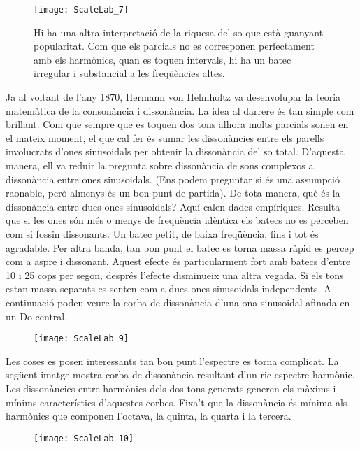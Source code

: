 \begin{figure}[h]
\centering
\texttt{[image: ScaleLab\_7]}
\caption*{Hi ha una altra interpretació de la riquesa del so que està guanyant popularitat. Com que els parcials no es corresponen perfectament amb els harmònics, quan es toquen intervals, hi ha un batec irregular i substancial a les freqüències altes.}
\end{figure}

Ja al voltant de l'any 1870, Hermann von Helmholtz va desenvolupar la teoria matemàtica de la consonància i dissonància. La idea al darrere és tan simple com brillant. Com que sempre que es toquen dos tons alhora molts parcials sonen en el mateix moment, el que cal fer és sumar les dissonàncies entre els parells involucrats d'ones sinusoidals per obtenir la dissonància del so total. D'aquesta manera, ell va reduir la pregunta sobre dissonància de sons complexos a dissonància entre ones sinusoidals. (Ens podem preguntar si és una assumpció raonable, però almenys és un bon punt de partida). De tota manera, què és la dissonància entre dues ones sinusoidals? Aquí calen dades empíriques. Resulta que si les ones són més o menys de freqüència idèntica els batecs no es perceben com si fossin dissonants. Un batec petit, de baixa freqüència, fins i tot és agradable. Per altra banda, tan bon punt el batec es torna massa ràpid es percep com a aspre i dissonant. Aquest efecte és particularment fort amb batecs d'entre 10 i 25 cops per segon, després l'efecte disminueix una altra vegada. Si els tons estan massa separats es senten com a dues ones sinusoidals independents. A continuació podeu veure la corba de dissonància d'una ona sinusoidal afinada en un Do central.

\begin{figure}[h]
\centering
\texttt{[image: ScaleLab\_9]}
\end{figure}

Les coses es posen interessants tan bon punt l'espectre es torna complicat. La següent imatge mostra corba de dissonància resultant d'un ric espectre harmònic. Les dissonàncies entre harmònics dels dos tons generats generen els màxims i mínims característics d'aquestes corbes. Fixa't que la dissonància és mínima als harmònics que componen l'octava, la quinta, la quarta i la tercera.

\begin{figure}[h]
\centering
\texttt{[image: ScaleLab\_10]}
\end{figure}


